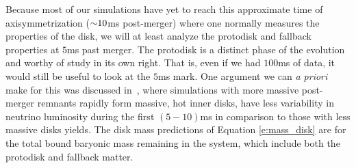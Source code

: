 Because most of our simulations have yet to reach this approximate time of axisymmetrization ($\mathord{\sim} 10$ms post-merger) where one normally measures the properties of the disk, we will at least analyze the protodisk and fallback properties at $5$ms past merger.
The protodisk is a distinct phase of the evolution and worthy of study in its own right.  
That is, even if we had $100$ms of data, it would still be useful to look at the $5$ms mark.
One argument we can \textit{a priori} make for this was discussed in~\cite{Foucart:2014nda}, where simulations with more massive post-merger remnants rapidly form massive, hot inner disks, have less variability in neutrino luminosity during the first $(5-10)$ms in comparison to those with less massive disks yields.
The disk mass predictions of Equation \ref{e:mass_disk} are for the total bound baryonic mass remaining in the system, which include both the protodisk and fallback matter.

